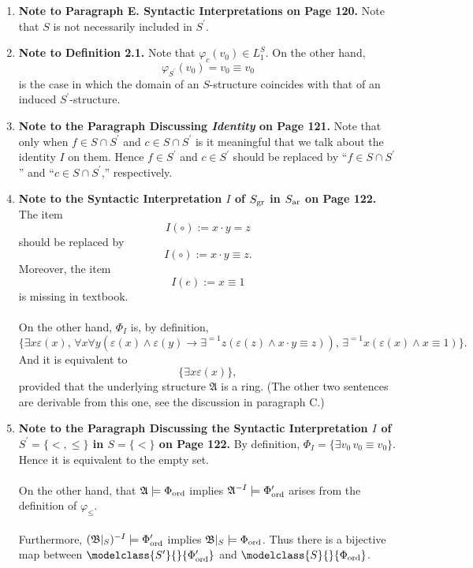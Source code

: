 \begin{enumerate}[1.]
\item \textbf{Note to Paragraph E. Syntactic Interpretations on Page 120.} Note that $S$ is not necessarily included in $S^\prime$.
%
\item \textbf{Note to Definition 2.1.} Note that $\varphi_c(v_0) \in L^S_1$. On the other hand,
\[
\varphi_{S^\prime}(v_0) = v_0 \equiv v_0
\]
is the case in which the domain of an $S$-structure coincides with that of an induced $S^\prime$-structure.
%
\item \textbf{Note to the Paragraph Discussing \textit{Identity} on Page 121.} Note that only when $f \in S \cap S^\prime$ and $c \in S \cap S^\prime$ is it meaningful that we talk about the identity $I$ on them. Hence $f \in S^\prime$ and $c \in S^\prime$ should be replaced by ``$f \in S \cap S^\prime$'' and ``$c \in S \cap S^\prime$,'' respectively.
%
\item \textbf{Note to the Syntactic Interpretation $I$ of $S_{\mbox{\scriptsize gr}}$ in $S_{\mbox{\scriptsize ar}}$ on Page 122.} The item
\[
I(\circ) := x \cdot y = z
\]
should be replaced by
\[
I(\circ) := x \cdot y \equiv z.
\]
Moreover, the item
\[
I(e) := x \equiv 1
\]
is missing in textbook.\\
\\
On the other hand, $\Phi_I$ is, by definition,
\[
\{\exists x \varepsilon (x), \, \forall x \forall y (\varepsilon (x) \land \varepsilon (y) \rightarrow \exists^{=1} z (\varepsilon (z) \land x \cdot y \equiv z)), \, \exists^{=1} x (\varepsilon (x) \land x \equiv 1)\}.
\]
And it is equivalent to
\[
\{\exists x \varepsilon (x)\},
\]
provided that the underlying structure $\mathfrak{A}$ is a ring. (The other two sentences are derivable from this one, see the discussion in paragraph C.)
%
\item \textbf{Note to the Paragraph Discussing the Syntactic Interpretation $I$ of $S^\prime = \{<, \leq\}$ in $S = \{<\}$ on Page 122.} By definition, $\Phi_I = \{ \exists v_0 \, v_0 \equiv v_0 \}$. Hence it is equivalent to the empty set.\\
\\On the other hand, that $\mathfrak{A} \models \Phi_{\mbox{\scriptsize ord}}$ implies $\mathfrak{A}^{-I} \models \Phi^\prime_{\mbox{\scriptsize ord}}$ arises from the definition of $\varphi_\leq$.\\
\\
Furthermore, $(\mathfrak{B}|_S)^{-I} \models \Phi_{\mbox{\scriptsize ord}}^\prime$ implies $\mathfrak{B}|_S \models \Phi_{\mbox{\scriptsize ord}}$. Thus there is a bijective map between $\modelclass{S^\prime}{}{\Phi^\prime_{\mbox{\scriptsize ord}}}$ and $\modelclass{S}{}{\Phi_{\mbox{\scriptsize ord}}}$.

\end{enumerate}
